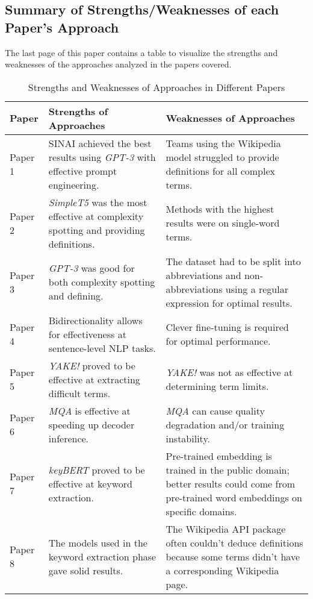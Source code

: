 \documentclass[runningheads]{llncs}
\begin{document}
\subsection{Summary of Strengths/Weaknesses of each Paper's Approach} 
The last page of this paper contains a table to visualize the strengths and weaknesses of the approaches analyzed in the papers covered.
\begin{table}[b]
    \centering
    \begin{tabular}{>{\RaggedRight}p{2.5cm} p{5cm} p{5cm}}
        \toprule
        \textbf{Paper} & \textbf{Strengths of Approaches} & \textbf{Weaknesses of Approaches} \\
        \midrule
        Paper 1 & SINAI achieved the best results using \textit{GPT-3} with effective prompt engineering. & Teams using the Wikipedia model struggled to provide definitions for all complex terms. \\
        Paper 2 & \textit{SimpleT5} was the most effective at complexity spotting and providing definitions. & Methods with the highest results were on single-word terms. \\
        Paper 3 & \textit{GPT-3} was good for both complexity spotting and defining. & The dataset had to be split into abbreviations and non-abbreviations using a regular expression for optimal results. \\
        Paper 4 & Bidirectionality allows for effectiveness at sentence-level NLP tasks. & Clever fine-tuning is required for optimal performance. \\
        Paper 5 & \textit{YAKE!} proved to be effective at extracting difficult terms. & \textit{YAKE!} was not as effective at determining term limits. \\
        Paper 6 & \textit{MQA} is effective at speeding up decoder inference. & \textit{MQA} can cause quality degradation and/or training instability. \\
        Paper 7 & \textit{keyBERT} proved to be effective at keyword extraction. & Pre-trained embedding is trained in the public domain; better results could come from pre-trained word embeddings on specific domains. \\
        Paper 8 & The models used in the keyword extraction phase gave solid results. & The Wikipedia API package often couldn't deduce definitions because some terms didn't have a corresponding Wikipedia page. \\
        \bottomrule
    \end{tabular}
    \caption{Strengths and Weaknesses of Approaches in Different Papers}
    \label{tab:strengths_weaknesses}
\end{table}
\end{document}
